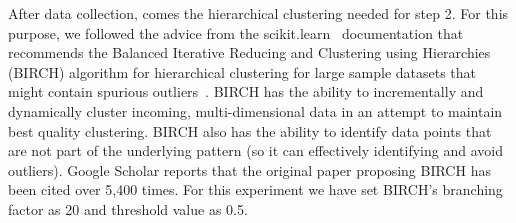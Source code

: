 \documentclass[10pt,journal,compsoc]{IEEEtran}
\begin{document}
 After data collection, comes  the  hierarchical clustering needed for step 2.
For this purpose, we followed the
advice from the scikit.learn~\cite{scikit-learn} documentation
that recommends the  Balanced Iterative Reducing and Clustering using Hierarchies  (BIRCH) algorithm for hierarchical
clustering for large sample datasets that might
contain spurious outliers~\cite{zhang1996birch}. 
BIRCH has the ability to incrementally and dynamically cluster incoming, multi-dimensional data in an attempt to maintain  best quality clustering. BIRCH also has the ability to identify data points that are not part of the underlying pattern (so it can effectively identifying and avoid outliers). 
 Google Scholar reports that  the original  paper proposing BIRCH has been cited over 5,400 times.
For this experiment we have set BIRCH's branching factor as 20 and  threshold  value  as  0.5.

 
\end{document}
